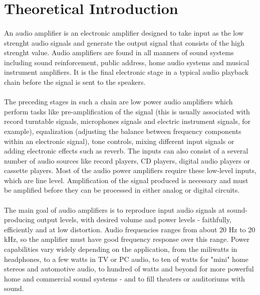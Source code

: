\section{Theoretical Introduction}
\label{sec:theoretical}

\paragraph{}
An audio amplifier is an electronic amplifier designed to take input as the low strenght audio signals and generate the output signal that consists of the high strenght value. Audio amplifiers are found in all manners of sound systems including sound reinforcement, public address, home audio systems and musical instrument amplifiers. It is the final electronic stage in a typical audio playback chain before the signal is sent to the speakers.

\paragraph{} 
The preceding stages in such a chain are low power audio amplifiers which perform tasks like pre-amplification of the signal (this is usually associated with record turntable signals, microphones signals and electric instrument signals, for example), equalization (adjusting the balance between frequency components within an electronic signal), tone controls, mixing different input signals or adding electronic effects such as reverb. The inputs can also consist of a several number of audio sources like record players, CD players, digital audio players or cassette players. Most of the audio power amplifiers require these low-level inputs, which are line level. Amplification of the signal produced is necessary and must be amplified before they can be processed in either analog or digital circuits.

\paragraph{} 
The main goal of audio amplifiers is to reproduce input audio signals at sound-producing output levels, with desired volume and power levels - faithfully, efficiently and at low distortion. Audio frequencies ranges from about 20 Hz to 20 kHz, so the amplifier must have good frequency response over this range. Power capabilities vary widely depending on the application, from the miliwatts in headphones, to a few watts in TV or PC audio, to ten of watts for "mini" home stereos and automotive audio, to hundred of watts and beyond for more powerful home and commercial sound systems - and to fill theaters or auditoriums with sound.

